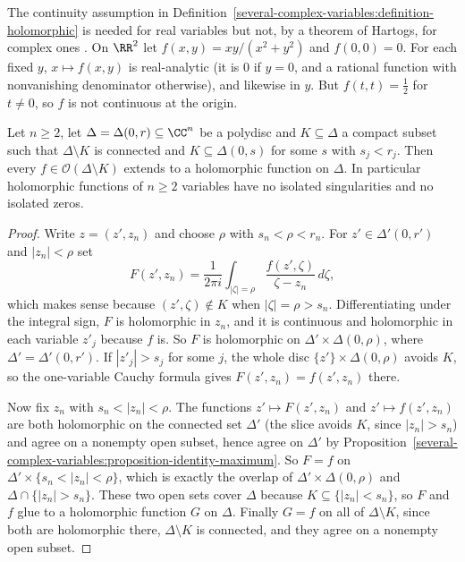 \begin{counterexample}\label{several-complex-variables:counterexample-separate-real}
The continuity assumption in Definition~\ref{several-complex-variables:definition-holomorphic} is needed for real variables but not, by a theorem of Hartogs, for complex ones \cite{hormander-scv}. On $\RR^2$ let
$f(x, y) = xy/(x^2 + y^2)$ and $f(0, 0) = 0$. For each fixed $y$, $x \mapsto f(x, y)$ is real-analytic (it is $0$ if $y = 0$, and a rational function with nonvanishing denominator otherwise), and likewise in $y$. But
$f(t, t) = \frac12$ for $t \neq 0$, so $f$ is not continuous at the origin.
\end{counterexample}

\begin{theorem}[Hartogs]\label{several-complex-variables:theorem-hartogs}
Let $n \geq 2$, let $\Delta = \Delta(0, r) \subseteq \CC^n$ be a polydisc and $K \subseteq \Delta$ a compact subset such that $\Delta \setminus K$ is connected and $K \subseteq \Delta(0, s) $ for some
$s$ with $s_j < r_j$. Then every $f \in \mathcal{O}(\Delta \setminus K)$ extends to a holomorphic function on $\Delta$. In particular holomorphic functions of $n \geq 2$ variables have no isolated
singularities and no isolated zeros.
\end{theorem}

\begin{proof}
Write $z = (z', z_n)$ and choose $\rho$ with $s_n < \rho < r_n$. For $z' \in \Delta'(0, r')$ and $|z_n| < \rho$ set
\[
F(z', z_n) = \frac{1}{2\pi i}\int_{|\zeta| = \rho}\frac{f(z', \zeta)}{\zeta - z_n}\,d\zeta,
\]
which makes sense because $(z', \zeta) \notin K$ when $|\zeta| = \rho > s_n$. Differentiating under the integral sign, $F$ is holomorphic in $z_n$, and it is continuous and holomorphic in each variable
$z'_j$ because $f$ is. So $F$ is holomorphic on $\Delta' \times \Delta(0, \rho)$, where $\Delta' = \Delta'(0, r')$. If $|z'_j| > s_j$ for some $j$, the whole disc $\{z'\} \times \Delta(0, \rho)$ avoids $K$, so the one-variable
Cauchy formula gives $F(z', z_n) = f(z', z_n)$ there.

Now fix $z_n$ with $s_n < |z_n| < \rho$. The functions $z' \mapsto F(z', z_n)$ and $z' \mapsto f(z', z_n)$ are both holomorphic on the connected set $\Delta'$ (the slice avoids $K$, since $|z_n| > s_n$) and
agree on a nonempty open subset, hence agree on $\Delta'$ by Proposition~\ref{several-complex-variables:proposition-identity-maximum}. So $F = f$ on $\Delta' \times \{s_n < |z_n| < \rho\}$, which is exactly
the overlap of $\Delta' \times \Delta(0, \rho)$ and $\Delta \cap \{|z_n| > s_n\}$. These two open sets cover $\Delta$ because $K \subseteq \{|z_n| < s_n\}$, so $F$ and $f$ glue to a holomorphic function $G$
on $\Delta$. Finally $G = f$ on all of $\Delta \setminus K$, since both are holomorphic there, $\Delta \setminus K$ is connected, and they agree on a nonempty open subset.
\end{proof}

